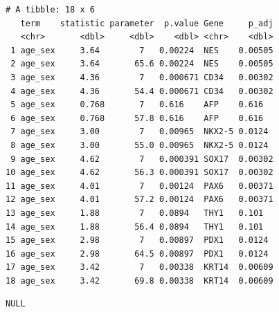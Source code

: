 \documentclass[
  letterpaper,
  DIV=11,
  numbers=noendperiod]{scrartcl}
\newenvironment{Shaded}{\begin{snugshade}}{\end{snugshade}}
\newcommand{\AttributeTok}[1]{\textcolor[rgb]{0.40,0.45,0.13}{#1}}
\newcommand{\CommentTok}[1]{\textcolor[rgb]{0.37,0.37,0.37}{#1}}
\newcommand{\DecValTok}[1]{\textcolor[rgb]{0.68,0.00,0.00}{#1}}
\newcommand{\FunctionTok}[1]{\textcolor[rgb]{0.28,0.35,0.67}{#1}}
\newcommand{\NormalTok}[1]{\textcolor[rgb]{0.00,0.23,0.31}{#1}}
\newcommand{\OtherTok}[1]{\textcolor[rgb]{0.00,0.23,0.31}{#1}}
\newcommand{\SpecialCharTok}[1]{\textcolor[rgb]{0.37,0.37,0.37}{#1}}
\newcommand{\StringTok}[1]{\textcolor[rgb]{0.13,0.47,0.30}{#1}}
\begin{document}
\begin{verbatim}
# A tibble: 18 x 6
   term    statistic parameter  p.value Gene     p_adj
   <chr>       <dbl>     <dbl>    <dbl> <chr>    <dbl>
 1 age_sex     3.64        7   0.00224  NES    0.00505
 2 age_sex     3.64       65.6 0.00224  NES    0.00505
 3 age_sex     4.36        7   0.000671 CD34   0.00302
 4 age_sex     4.36       54.4 0.000671 CD34   0.00302
 5 age_sex     0.768       7   0.616    AFP    0.616  
 6 age_sex     0.768      57.8 0.616    AFP    0.616  
 7 age_sex     3.00        7   0.00965  NKX2-5 0.0124 
 8 age_sex     3.00       55.0 0.00965  NKX2-5 0.0124 
 9 age_sex     4.62        7   0.000391 SOX17  0.00302
10 age_sex     4.62       56.3 0.000391 SOX17  0.00302
11 age_sex     4.01        7   0.00124  PAX6   0.00371
12 age_sex     4.01       57.2 0.00124  PAX6   0.00371
13 age_sex     1.88        7   0.0894   THY1   0.101  
14 age_sex     1.88       56.4 0.0894   THY1   0.101  
15 age_sex     2.98        7   0.00897  PDX1   0.0124 
16 age_sex     2.98       64.5 0.00897  PDX1   0.0124 
17 age_sex     3.42        7   0.00338  KRT14  0.00609
18 age_sex     3.42       69.8 0.00338  KRT14  0.00609
\end{verbatim}

\begin{verbatim}
NULL
\end{verbatim}

\begin{Shaded}
\end{Shaded}
\end{document}
